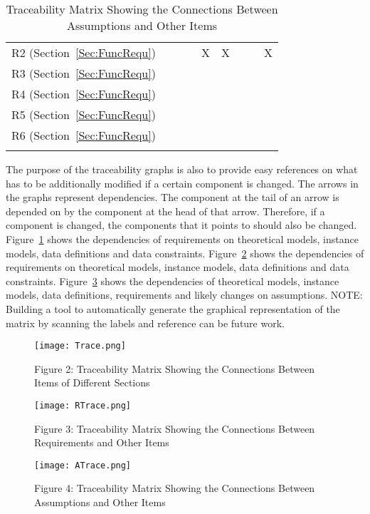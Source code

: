 \documentclass[12pt]{article}
\begin{document}
\begin{longtable}{l l l l l l l l l}
\\
R2 (Section~\ref{Sec:FuncRequ}) &  &  &  & X & X &  &  & X
\\
R3 (Section~\ref{Sec:FuncRequ}) &  &  &  &  &  &  &  & 
\\
R4 (Section~\ref{Sec:FuncRequ}) &  &  &  &  &  &  &  & 
\\
R5 (Section~\ref{Sec:FuncRequ}) &  &  &  &  &  &  &  & 
\\
R6 (Section~\ref{Sec:FuncRequ}) &  &  &  &  &  &  &  & 
\\
\bottomrule
\caption{Traceability Matrix Showing the Connections Between Assumptions and Other Items}
\label{Table:TracMatrShowtheConnBetwAssuandOtheItem}
\end{longtable}
The purpose of the traceability graphs is also to provide easy references on what has to be additionally modified if a certain component is changed. The arrows in the graphs represent dependencies. The component at the tail of an arrow is depended on by the component at the head of that arrow. Therefore, if a component is changed, the components that it points to should also be changed. Figure~\ref{Figure:Figu2:TracMatrShowtheConnBetwItemofDiffSect} shows the dependencies of requirements on theoretical models, instance models, data definitions and data constraints. Figure~\ref{Figure:Figu3:TracMatrShowtheConnBetwRequandOtheItem} shows the dependencies of requirements on theoretical models, instance models, data definitions and data constraints. Figure~\ref{Figure:Figu4:TracMatrShowtheConnBetwAssuandOtheItem} shows the dependencies of theoretical models, instance models, data definitions, requirements and likely changes on assumptions.
NOTE: Building a tool to automatically generate the graphical representation of the matrix by scanning the labels and reference can be future work.
\begin{figure}
\begin{center}
\texttt{[image: Trace.png]}
\caption{Figure 2: Traceability Matrix Showing the Connections Between Items of Different Sections}
\label{Figure:Figu2:TracMatrShowtheConnBetwItemofDiffSect}
\end{center}
\end{figure}
\begin{figure}
\begin{center}
\texttt{[image: RTrace.png]}
\caption{Figure 3: Traceability Matrix Showing the Connections Between Requirements and Other Items}
\label{Figure:Figu3:TracMatrShowtheConnBetwRequandOtheItem}
\end{center}
\end{figure}
\begin{figure}
\begin{center}
\texttt{[image: ATrace.png]}
\caption{Figure 4: Traceability Matrix Showing the Connections Between Assumptions and Other Items}
\label{Figure:Figu4:TracMatrShowtheConnBetwAssuandOtheItem}
\end{center}
\end{figure}
\end{document}
